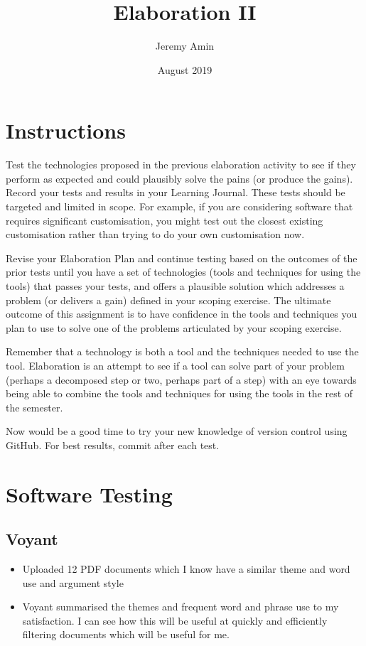 \documentclass{article}
\title{Elaboration II}
\author{Jeremy Amin}
\date{August 2019}
\begin{document}
\maketitle

\tableofcontents

\section{Instructions}

Test the technologies proposed in the previous elaboration activity to see if they perform as expected and could plausibly solve the pains (or produce the gains). Record your tests and results in your Learning Journal. These tests should be targeted and limited in scope. For example, if you are considering software that requires significant customisation, you might test out the closest existing customisation rather than trying to do your own customisation now.

Revise your Elaboration Plan and continue testing based on the outcomes of the prior tests until you have a set of technologies (tools and techniques for using the tools) that passes your tests, and offers a plausible solution which addresses a problem (or delivers a gain) defined in your scoping exercise. The ultimate outcome of this assignment is to have confidence in the tools and techniques you plan to use to solve one of the problems articulated by your scoping exercise. 

Remember that a technology is both a tool and the techniques needed to use the tool. Elaboration is an attempt to see if a tool can solve part of your problem (perhaps a decomposed step or two, perhaps part of a step) with an eye towards being able to combine the tools and techniques for using the tools in the rest of the semester. 

Now would be a good time to try your new knowledge of version control using GitHub. For best results, commit after each test.

\section{Software Testing}

\subsection{Voyant}

\begin{itemize}
    \item Uploaded 12 PDF documents which I know have a similar theme and word use and argument style
    \item Voyant summarised the themes and frequent word and phrase use to my satisfaction. I can see how this will be useful at quickly and efficiently filtering documents which will be useful for me.
    \end{itemize}
    
\end{document}
